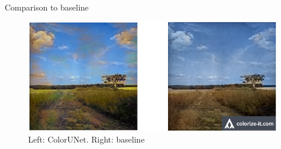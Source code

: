 \documentclass[final]{beamer}
\newlength{\onecolwid}
\begin{document}
\begin{frame}[t]
\begin{columns}[t]
\begin{column}{\onecolwid}
\begin{block}{Comparison to baseline}
\begin{figure}
\begin{center}
\includegraphics[width=0.7\linewidth]{compare}
\caption{Left: ColorUNet. Right: baseline \cite{zhang2016colorful}}
\label{histogram}
\end{center}
\end{figure}


\end{block}











\end{column}
\end{columns}
\end{frame}
\end{document}
